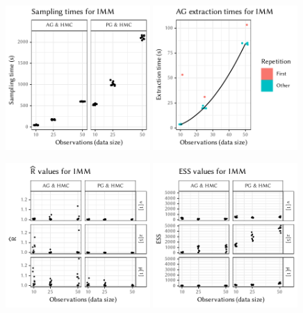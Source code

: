 \begin{figure}[p]
  \centering
  \includegraphics[width=0.49\textwidth]{figures/IMM-sampling_times}
  \includegraphics[width=0.49\textwidth]{figures/IMM-compile_times}
  \par
  \includegraphics[width=0.49\textwidth]{figures/IMM-rhat}
  \includegraphics[width=0.49\textwidth]{figures/IMM-ess}

\end{figure}
